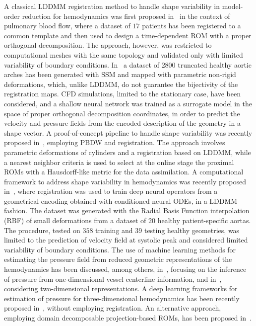 A classical LDDMM registration method to handle shape variability in model-order reduction for hemodynamics was first proposed in~\cite{guibert2014group} in the context of pulmonary blood flow, where a dataset of $17$ patients has been registered to a common template and then used to design a time-dependent ROM with a proper orthogonal decomposition.
The approach, however, was restricted to computational meshes with the same topology and validated only with limited variability of boundary conditions.
%
In~\cite{pajaziti2023shape} a dataset of $2800$ truncated healthy aortic arches has been generated with SSM and mapped with parametric non-rigid deformations, which, 
unlike LDDMM, do not guarantee the bijectivity of the registration maps. CFD simulations, limited to the stationary case, have been considered, and a shallow neural network was trained as a surrogate model in the space of proper orthogonal decomposition coordinates, in order to predict the velocity and pressure fields from the encoded description of the geometry in a shape vector. 
%
A proof-of-concept pipeline to handle shape variability was recently proposed in~\cite{galarce2022state}, employing PBDW and registration. The approach involves parametric deformations of cylinders and a registration based on LDDMM, while a nearest neighbor criteria is used to select at the online stage the proximal ROMs with a Hausdorff-like metric for the data assimilation.
%
A computational framework to address shape variability in hemodynamics was recently proposed in~\cite{Tenderini2024}, where registration was used to train
deep neural operators from a geometrical encoding obtained with conditioned neural ODEs, in a LDDMM fashion. The dataset was generated with the Radial Basis Function interpolation (RBF) of small deformations from a dataset of $20$ healthy patient-specific aortas. 
The procedure, tested on $358$ training and $39$ testing healthy geometries, was limited to the prediction of velocity field at systolic peak and considered limited variability of boundary conditions.
%
The use of machine learning methods for estimating the pressure field from reduced geometric representations of the hemodynamics has been discussed, among others, in~\cite{pegolotti2024learning,iacovelli2023novel, yevtushenko2021deep, versnjak2024deep},
focusing on the inference of pressure from one-dimensional vessel centerline information, and in~\cite{10.1115/1.4055285}, considering two-dimensional representations.
A deep learning frameworks for estimation of pressure for three-dimensional hemodynamics has been recently 
proposed in~\cite{nannini2025learninghemodynamicscalarfields}, without employing registration. An alternative approach, employing domain decomposable projection-based ROMs, has been proposed in~\cite{PEGOLOTTI2021113762}.

